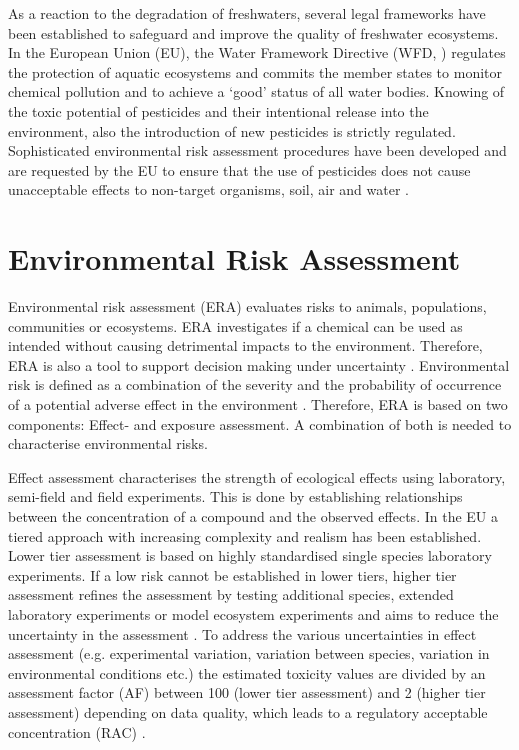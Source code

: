As a reaction to the degradation of freshwaters, several legal frameworks have been established to safeguard and improve the quality of freshwater ecosystems. 
In the European Union (EU), the Water Framework Directive (WFD, \citet{european_union_directive_2000}) regulates the protection of aquatic ecosystems and commits the member states to monitor chemical pollution and to achieve a `good' status of all water bodies. 
Knowing of the toxic potential of pesticides and their intentional release into the environment, also the introduction of new pesticides is strictly regulated.
Sophisticated environmental risk assessment procedures have been developed and are requested by the EU to ensure that the use of pesticides does not cause unacceptable effects to non-target organisms, soil, air and water \citep{european_union_regulation_2009}. 



\section{Environmental Risk Assessment}

Environmental risk assessment (ERA) evaluates risks to animals, populations, communities or ecosystems.
ERA investigates if a chemical can be used as intended without causing detrimental impacts to the environment.
Therefore, ERA is also a tool to support decision making under uncertainty \citep{newman_fundamentals_2015}. 
Environmental risk is defined as a combination of the severity and the probability of occurrence of a potential adverse effect in the environment \citep{suter_ecological_2007}. 
Therefore, ERA is based on two components: Effect- and exposure assessment.
A combination of both is needed to characterise environmental risks.

Effect assessment characterises the strength of ecological effects using laboratory, semi-field and field experiments.
This is done by establishing relationships between the concentration of a compound and the observed effects.
In the EU a tiered approach with increasing complexity and realism has been established.
Lower tier assessment is based on highly standardised single species laboratory experiments.
If a low risk cannot be established in lower tiers, higher tier assessment refines the assessment by testing additional species, extended laboratory experiments or model ecosystem experiments and aims to reduce the uncertainty in the assessment \citep{efsa_guidance_2013, brock_aquatic_2006}. 
To address the various uncertainties in effect assessment (e.g. experimental variation, variation between species, variation in environmental conditions etc.) the estimated toxicity values are divided by an assessment factor (AF) between 100 (lower tier assessment) and 2 (higher tier assessment) depending on data quality, which leads to a regulatory acceptable concentration (RAC) \citep{efsa_guidance_2013, brock_aquatic_2006}. 

